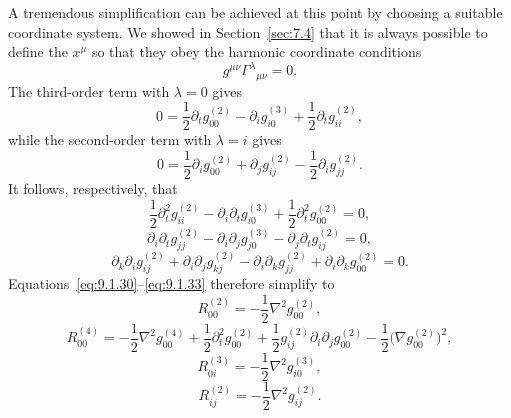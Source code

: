 A tremendous simplification can be achieved at this point by choosing a
suitable coordinate system. We showed in Section~\ref{sec:7.4} that it is
always possible to define the \(x^\mu\) so that they obey the harmonic
coordinate conditions
\begin{equation}
  g^{\mu\nu}\Gamma^\lambda{}_{\mu\nu}=0.
  \tag{9.1.34}\label{eq:9.1.34}
\end{equation}
The third-order term with \(\lambda=0\) gives
\begin{equation}
  0=
  \frac12\partial_tg_{00}^{(2)}
  -\partial_i g_{i0}^{(3)}
  +\frac12\partial_tg_{ii}^{(2)},
  \tag{9.1.35}\label{eq:9.1.35}
\end{equation}
while the second-order term with \(\lambda=i\) gives
\begin{equation}
  0=
  \frac12\partial_i g_{00}^{(2)}
  +\partial_jg_{ij}^{(2)}
  -\frac12\partial_i g_{jj}^{(2)}.
  \tag{9.1.36}\label{eq:9.1.36}
\end{equation}
It follows, respectively, that
\[
  \frac12\partial_t^2g_{ii}^{(2)}
  -\partial_i\partial_tg_{i0}^{(3)}
  +\frac12\partial_t^2g_{00}^{(2)}=0,
\]
\[
  \partial_i\partial_tg_{jj}^{(2)}
  -\partial_i\partial_jg_{j0}^{(3)}
  -\partial_j\partial_tg_{ij}^{(2)}=0,
\]
\[
  \partial_k\partial_i g_{ij}^{(2)}
  +\partial_i\partial_jg_{kj}^{(2)}
  -\partial_i\partial_k g_{jj}^{(2)}
  +\partial_i\partial_k g_{00}^{(2)}=0.
\]
Equations~\eqref{eq:9.1.30}--\eqref{eq:9.1.33} therefore simplify to
\begin{equation}
  R_{00}^{(2)}=-\frac12\nabla^2g_{00}^{(2)},
  \tag{9.1.37}\label{eq:9.1.37}
\end{equation}
\begin{equation}
  R_{00}^{(4)}
  =
  -\frac12\nabla^2g_{00}^{(4)}
  +\frac12\partial_t^2g_{00}^{(2)}
  +\frac12g_{ij}^{(2)}\partial_i\partial_jg_{00}^{(2)}
  -\frac12\bigl(\nabla g_{00}^{(2)}\bigr)^2,
  \tag{9.1.38}\label{eq:9.1.38}
\end{equation}
\begin{equation}
  R_{0i}^{(3)}=-\frac12\nabla^2g_{i0}^{(3)},
  \tag{9.1.39}\label{eq:9.1.39}
\end{equation}
\begin{equation}
  R_{ij}^{(2)}=-\frac12\nabla^2g_{ij}^{(2)}.
  \tag{9.1.40}\label{eq:9.1.40}
\end{equation}

